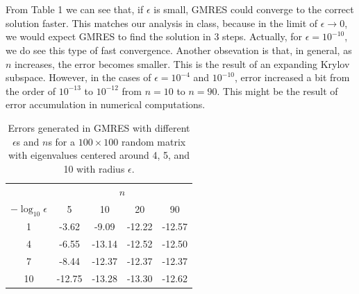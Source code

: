 \documentclass[11pt]{article}
\begin{document}
\section{}
From Table 1 we can see that, if $\epsilon$ is small, GMRES could converge to the correct solution faster. This matches our analysis in class, because in the limit of $\epsilon\to0$, we would expect GMRES to find the solution in 3 steps. Actually, for $\epsilon=10^{-10}$, we do see this type of fast convergence. Another obsevation is that, in general, as $n$ increases, the error becomes smaller. This is the result of an expanding Krylov subspace. However, in the cases of $\epsilon=10^{-4}$ and $10^{-10}$, error increased a bit from the order of $10^{-13}$ to $10^{-12}$ from $n=10$ to $n=90$. This might be the result of error accumulation in numerical computations.
\begin{center}
\begin{table}
\caption{Errors generated in GMRES with different $\epsilon$s and $n$s for a $100\times100$ random matrix with eigenvalues centered around 4, 5, and 10 with radius $\epsilon$.}
\centering
\begin{tabular}[h]{| c |  c c c c |} 
\hline
 & \multicolumn{4}{c|}{$n$} \\
 $-\log_{10}\epsilon$  & 5 & 10 & 20 & 90 \\[0.3ex] \hline
   1  & -3.62 & -9.09 & -12.22 & -12.57 \\
  4  & -6.55 & -13.14 & -12.52 & -12.50 \\
  7  & -8.44 & -12.37 & -12.37 & -12.37 \\
 10  & -12.75 & -13.28 & -13.30 & -12.62 \\\hline
\end{tabular}
\end{table}
\end{center}
\pagebreak
\end{document}
